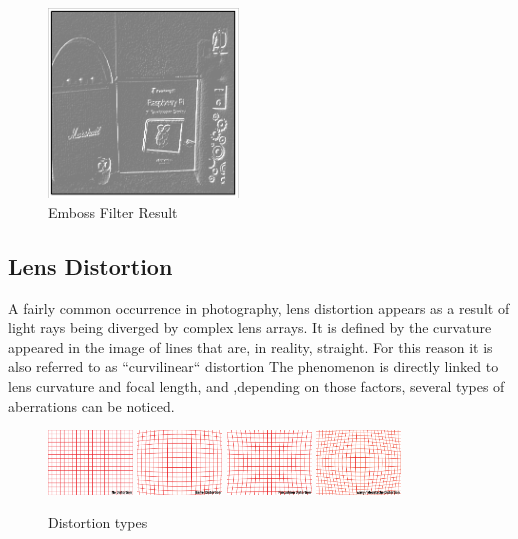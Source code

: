 \begin{figure}[H]
	\includegraphics[width=0.45\textwidth, height=0.45\textwidth]{resources/Emboss_2.png}
	\caption{Emboss Filter Result}
\end{figure}

\subsection{Lens Distortion}

A fairly common occurrence in photography, lens distortion appears as a result of light rays being diverged
by complex lens arrays. It is defined by the curvature appeared in the image of lines that are, in reality,
straight. For this reason it is also referred to as ``curvilinear`` distortion The phenomenon is directly
linked to lens curvature and focal length, and ,depending on those factors, several types of aberrations
can be noticed. \cite{lensImages}
\begin{figure}[H]
	\label{fig:distortionTypes}
	\includegraphics[width=0.2\textwidth, height=0.2\textwidth]{resources/No-Distortion.png}
	\includegraphics[width=0.2\textwidth, height=0.2\textwidth]{resources/Barrel-Distortion.png}
	\includegraphics[width=0.2\textwidth, height=0.2\textwidth]{resources/Pincushion-Distortion.png}
	\includegraphics[width=0.2\textwidth, height=0.2\textwidth]{resources/Wavy-Moustache-Distortion.png}
	\caption{Distortion types \cite{lensImages}}
\end{figure}

